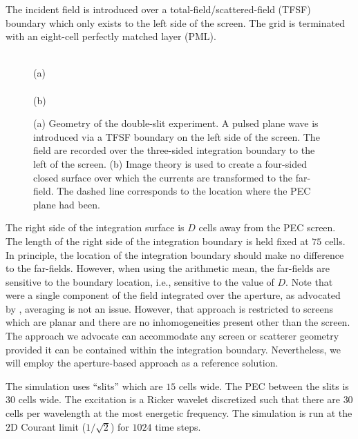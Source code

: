 The incident field is introduced over a total-field/scattered-field
(TFSF) boundary which only exists to the left side of the screen.  The
grid is terminated with an eight-cell perfectly matched layer (PML).
\begin{figure}
\begin{center}
\\
\vspace{-.15in}
(a)\\
\vspace{.15in}
\\
\vspace{-.15in}
(b)
\end{center}
\caption{(a) Geometry of the double-slit experiment.  A pulsed plane
wave is introduced via a TFSF boundary on the left side of the screen.
The field are recorded over the three-sided integration boundary to
the left of the screen.  (b) Image theory is used to create a
four-sided closed surface over which the currents are transformed
to the far-field.  The dashed line corresponds to the location where
the PEC plane had been.}
\label{fig:youngGeometry}
\end{figure}

The right side of the integration surface is $D$ cells away from the
PEC screen.  The length of the right side of the integration boundary
is held fixed at $75$ cells.  In principle, the location of the
integration boundary should make no difference to the far-fields.
However, when using the arithmetic mean, the far-fields are sensitive
to the boundary location, i.e., sensitive to the value of $D$.  Note
that were a single component of the field integrated over the
aperture, as advocated by \cite{sullivan2001a}, averaging is not an
issue.  However, that approach is restricted to screens which are
planar and there are no inhomogeneities present other than the screen.
The approach we advocate can accommodate any screen or scatterer
geometry provided it can be contained within the integration boundary.
Nevertheless, we will employ the aperture-based approach as a
reference solution.

The simulation uses ``slits'' which are $15$ cells wide.  The PEC
between the slits is $30$ cells wide.  The excitation is a Ricker
wavelet discretized such that there are $30$ cells per wavelength at
the most energetic frequency.  The simulation is run at the $2$D Courant
limit ($1/\sqrt{2}$) for $1024$ time steps.  

